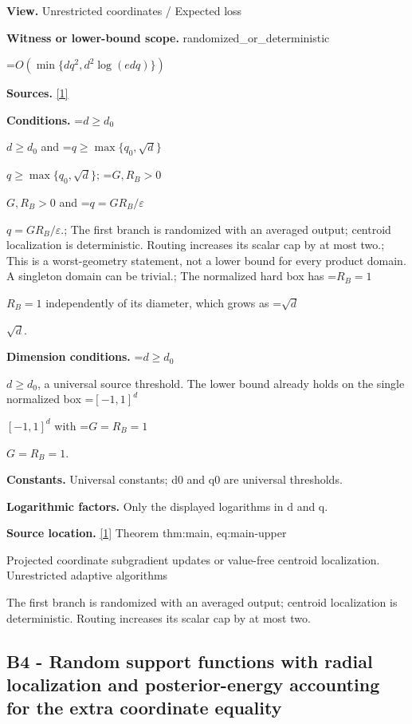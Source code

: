 \documentclass[10pt,a4paper]{article}
\newcommand{\AtlasMath}[1]{\par\begingroup\centering\setbox0=\hbox{$\displaystyle #1$}\ifdim\wd0>1.4\linewidth\typeout{ATLAS WIDE FORMULA: \the\wd0}\fi\ifdim\wd0>\linewidth\resizebox{\linewidth}{!}{\box0}\else\box0\fi\par\endgroup}
\newcommand{\AtlasInlineMath}[1]{\begingroup\setbox0=\hbox{$#1$}\ifdim\wd0>.4\linewidth\endgroup\AtlasMath{#1}\else\endgroup$#1$\fi}
\begin{document}
\textbf{View.} Unrestricted coordinates / Expected loss



\textbf{Witness or lower-bound scope.} randomized\_or\_deterministic



\AtlasMath{O(\min\{dq^2,d^2\log(edq)\})}


\textbf{Sources.} \href{https://github.com/WU-Wendao/Colombo/blob/main/colombo_sensorium/Complexity_altas/data/sources/colombo/U03/manuscript.pdf}{[1]}



\textbf{Conditions.} \AtlasInlineMath{d\ge d_0} and \AtlasInlineMath{q\ge\max\{q_0,\sqrt d\}}; \AtlasInlineMath{G,R_B>0} and \AtlasInlineMath{q=GR_B/\varepsilon}.; The first branch is randomized with an averaged output; centroid localization is deterministic. Routing increases its scalar cap by at most two.; This is a worst-geometry statement, not a lower bound for every product domain. A singleton domain can be trivial.; The normalized hard box has \AtlasInlineMath{R_B=1} independently of its diameter, which grows as \AtlasInlineMath{\sqrt d}.



\textbf{Dimension conditions.} \AtlasInlineMath{d\ge d_0}, a universal source threshold. The lower bound already holds on the single normalized box \AtlasInlineMath{[-1,1]^d} with \AtlasInlineMath{G=R_B=1}.



\textbf{Constants.} Universal constants; d0 and q0 are universal thresholds.



\textbf{Logarithmic factors.} Only the displayed logarithms in d and q.



\textbf{Source location.} \href{https://github.com/WU-Wendao/Colombo/blob/main/colombo_sensorium/Complexity_altas/data/sources/colombo/U03/manuscript.pdf}{[1]} Theorem thm:main, eq:main-upper



Projected coordinate subgradient updates or value-free centroid localization. Unrestricted adaptive algorithms



The first branch is randomized with an averaged output; centroid localization is deterministic. Routing increases its scalar cap by at most two.



\subsection{B4 - Random support functions with radial localization and posterior-energy accounting for the extra coordinate equality}
\end{document}
